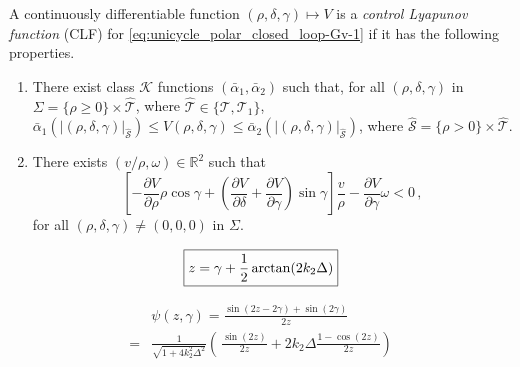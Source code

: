 \documentclass[10pt,a4paper]{amsart}
\begin{document}
\begin{definition}
\label{def-CLF}
A continuously differentiable function $(\rho,\delta,\gamma)\mapsto V$ 
is a \textit{control Lyapunov function} (CLF) for \eqref{eq:unicycle_polar_closed_loop-Gv-1} if it has the following properties.
\begin{enumerate}
\item There exist class $\mathcal{K}$ functions  $(\bar\alpha_1,\bar\alpha_2)$ such that,  for all $(\rho,\delta,\gamma)$ in 
$\Sigma = \{\rho\geq 0\}\times \hat{\mathcal{T}}$, where $\hat{\mathcal{T}}\in\{\mathcal{T},\mathcal{T}_1\}$, 
$ \bar\alpha_1(|(\rho,\delta, \gamma)|_{\hat{\mathcal{S}}}) \le V(\rho,\delta,\gamma) \le \bar\alpha_2(|(\rho,\delta, \gamma)|_{\hat{\mathcal{S}}})$, where $\hat{\mathcal{S}} = \{\rho> 0\}\times \hat{\mathcal{T}}$. \label{it:clf_prop_1}
\item There exists $(v/\rho,\omega)\in \mathbb{R}^2$ such that
\begin{equation*}
\left[-\dfrac{\partial V}{\partial\rho}\rho\cos\gamma + \left(\dfrac{\partial V}{\partial\delta}+\dfrac{\partial V}{\partial\gamma}\right)\sin\gamma \right]\dfrac{v}{\rho} - \dfrac{\partial V}{\partial\gamma}\omega < 0 \,,
\end{equation*}
for all $(\rho,\delta,\gamma)\neq (0,0,0)$ in $\Sigma$. \label{it:clf_prop_2}
\end{enumerate}
\end{definition}

\begin{align}
\label{eq:backstepping_z}
\fbox{$\displaystyle z = \gamma + \frac{1}{2}\arctan(2 k_2 \Delta)$}
\end{align}

\begin{align}
&\psi(z,\gamma) = \frac{\sin(2z-2\gamma) +\sin(2\gamma)}{2z}
\nonumber\\
=& \frac{1}{\sqrt{1 + 4k_2^2 \Delta^2}} \left(\,\frac{\sin(2z)}{2z}
+ 2k_2 \Delta \frac{1 - \cos(2z)}{2z}\right)
 \label{eq:psi_definition}
\end{align}
\end{document}
